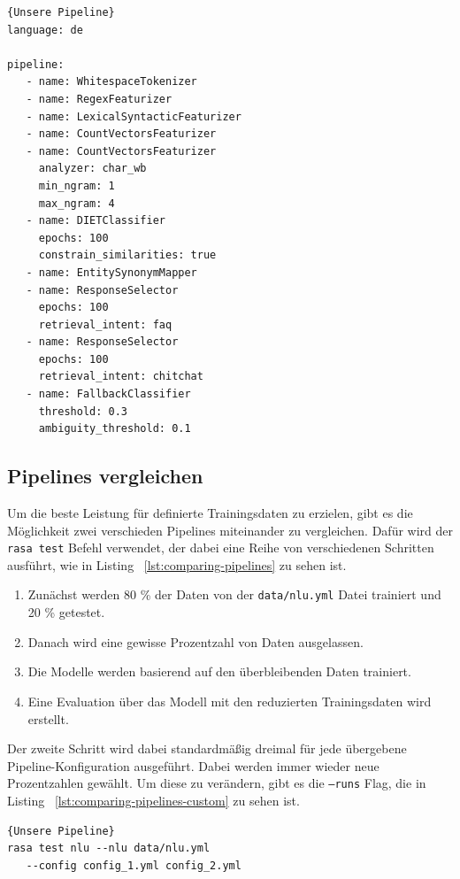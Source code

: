 \begin{lstlisting}[label={lst:our-pipeline},caption={Unsere Pipeline}]{Unsere Pipeline}
language: de

pipeline:
   - name: WhitespaceTokenizer
   - name: RegexFeaturizer
   - name: LexicalSyntacticFeaturizer
   - name: CountVectorsFeaturizer
   - name: CountVectorsFeaturizer
     analyzer: char_wb
     min_ngram: 1
     max_ngram: 4
   - name: DIETClassifier
     epochs: 100
     constrain_similarities: true
   - name: EntitySynonymMapper
   - name: ResponseSelector
     epochs: 100
     retrieval_intent: faq
   - name: ResponseSelector
     epochs: 100
     retrieval_intent: chitchat
   - name: FallbackClassifier
     threshold: 0.3
     ambiguity_threshold: 0.1
\end{lstlisting}

\subsection{Pipelines vergleichen}\label{subsec:comparing-pipelines}

Um die beste Leistung für definierte Trainingsdaten zu erzielen, gibt es die Möglichkeit zwei verschieden Pipelines miteinander zu vergleichen.
Dafür wird der \texttt{rasa test} Befehl verwendet, der dabei eine Reihe von verschiedenen Schritten ausführt, wie in Listing ~\ref{lst:comparing-pipelines} zu sehen ist.

\begin{enumerate}
    \item Zunächst werden 80 \% der Daten von der \texttt{data/nlu.yml} Datei trainiert und 20 \% getestet.
    \item Danach wird eine gewisse Prozentzahl von Daten ausgelassen.
    \item Die Modelle werden basierend auf den überbleibenden Daten trainiert.
    \item Eine Evaluation über das Modell mit den reduzierten Trainingsdaten wird erstellt.\cite{comparingNLUPipelines}
\end{enumerate}

Der zweite Schritt wird dabei standardmäßig dreimal für jede übergebene Pipeline-Konfiguration ausgeführt.
Dabei werden immer wieder neue Prozentzahlen gewählt.
Um diese zu verändern, gibt es die \texttt{--runs} Flag, die in Listing ~\ref{lst:comparing-pipelines-custom} zu sehen ist.\cite{comparingNLUPipelines}

\begin{lstlisting}[label={lst:comparing-pipelines},caption={Unsere Pipeline}]{Unsere Pipeline}
rasa test nlu --nlu data/nlu.yml
   --config config_1.yml config_2.yml
\end{lstlisting}

